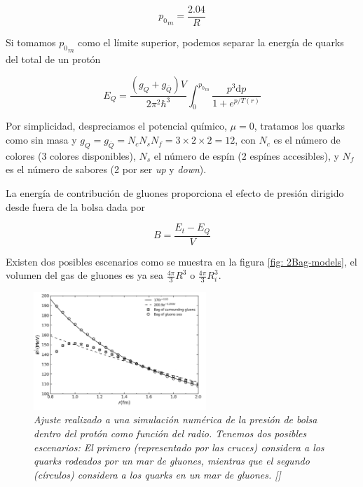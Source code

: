 \begin{equation}\label{eq-maxp}
{{p}_{0}}_{m} = \frac{2.04}{R}
\end{equation}

Si tomamos ${{p}_{0}}_{m}$ como el límite superior, podemos separar la energía de quarks del total de un protón

\begin{equation}
{E}_{Q} = \frac{\left({g}_{Q} + {g}_{\bar{Q}} \right) V}{2{\pi}^{2}{\hbar}^{3}} \int_{0}^{{{p}_{0}}_{m}} \frac{{p}^{3} \mathrm{d}p}{1 + {e}^{p/T(r)}}
\end{equation}

Por simplicidad, despreciamos el potencial químico, $\mu=0$, tratamos los quarks como sin masa y ${g}_{Q} = {g}_{\bar{Q}} = {N}_{c}{N}_{s}{N}_{f} = 3 \times 2 \times 2 = 12$, con ${N}_{c}$ es el número de colores (3 colores disponibles), ${N}_{s}$ el número de espín (2 espínes accesibles), y ${N}_{f}$ es el número de sabores (2 por ser \emph{up} y \emph{down}).


La energía de contribución de gluones proporciona el efecto de presión dirigido desde fuera de la bolsa dada por

\begin{equation}
B = \frac{{E}_{t} - {E}_{Q}}{V}
\end{equation}

Existen dos posibles escenarios como se muestra en la figura \ref{fig: 2Bag-models}, el volumen del gas de gluones es ya sea $\frac{4 \pi}{3} {R}^{3}$ o $\frac{4\pi}{3}{R}_{i}^{3}$.

\begin{figure}
\centering\includegraphics[width=0.58\textwidth]{./Images/B(R).png}

\caption[Presión de bolsa como función del radio del protón]{\emph{Ajuste realizado a una simulación numérica de la presión de bolsa dentro del protón como función del radio. Tenemos dos posibles escenarios: El primero (representado por las cruces) considera a los quarks rodeados por un mar de gluones, mientras que el segundo (círculos) considera a los quarks en un mar de gluones. []}}
\label{fig: B(r)}
\end{figure}

